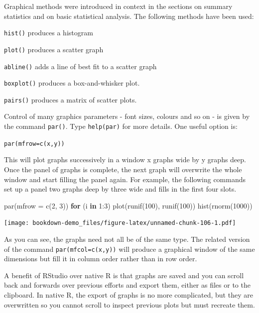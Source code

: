 \documentclass[
]{book}
\newenvironment{Shaded}{\begin{snugshade}}{\end{snugshade}}
\newcommand{\AttributeTok}[1]{\textcolor[rgb]{0.77,0.63,0.00}{#1}}
\newcommand{\ControlFlowTok}[1]{\textcolor[rgb]{0.13,0.29,0.53}{\textbf{#1}}}
\newcommand{\DecValTok}[1]{\textcolor[rgb]{0.00,0.00,0.81}{#1}}
\newcommand{\FunctionTok}[1]{\textcolor[rgb]{0.00,0.00,0.00}{#1}}
\newcommand{\NormalTok}[1]{#1}
\newcommand{\SpecialCharTok}[1]{\textcolor[rgb]{0.00,0.00,0.00}{#1}}
\begin{document}
Graphical methods were introduced in context in the sections on summary statistics and on basic statistical analysis. The following methods have been used:

\texttt{hist()} produces a histogram

\texttt{plot()} produces a scatter graph

\texttt{abline()} adds a line of best fit to a scatter graph

\texttt{boxplot()} produces a box-and-whisker plot.

\texttt{pairs()} produces a matrix of scatter plots.

Control of many graphics parameters - font sizes, colours and so on - is given by the command \texttt{par()}. Type \texttt{help(par)} for more details. One useful option is:

\texttt{par(mfrow=c(x,y))}

This will plot graphs successively in a window x graphs wide by y graphs deep. Once the panel of graphs is complete, the next graph will overwrite the whole window and start filling the panel again. For example, the following commands set up a panel two graphs deep by three wide and fills in the first four slots.

\begin{Shaded}
\begin{Highlighting}[]
\FunctionTok{par}\NormalTok{(}\AttributeTok{mfrow =} \FunctionTok{c}\NormalTok{(}\DecValTok{2}\NormalTok{, }\DecValTok{3}\NormalTok{))}
\ControlFlowTok{for}\NormalTok{ (i }\ControlFlowTok{in} \DecValTok{1}\SpecialCharTok{:}\DecValTok{3}\NormalTok{) }\FunctionTok{plot}\NormalTok{(}\FunctionTok{runif}\NormalTok{(}\DecValTok{100}\NormalTok{), }\FunctionTok{runif}\NormalTok{(}\DecValTok{100}\NormalTok{))}
\FunctionTok{hist}\NormalTok{(}\FunctionTok{rnorm}\NormalTok{(}\DecValTok{1000}\NormalTok{))}
\end{Highlighting}
\end{Shaded}

\texttt{[image: bookdown-demo\_files/figure-latex/unnamed-chunk-106-1.pdf]}

As you can see, the graphs need not all be of the same type. The related version of the command \texttt{par(mfcol=c(x,y))} will produce a graphical window of the same dimensions but fill it in column order rather than in row order.

A benefit of RStudio over native R is that graphs are saved and you can scroll back and forwards over previous efforts and export them, either as files or to the clipboard. In native R, the export of graphs is no more complicated, but they are overwritten so you cannot scroll to inspect previous plots but must recreate them.
\end{document}
